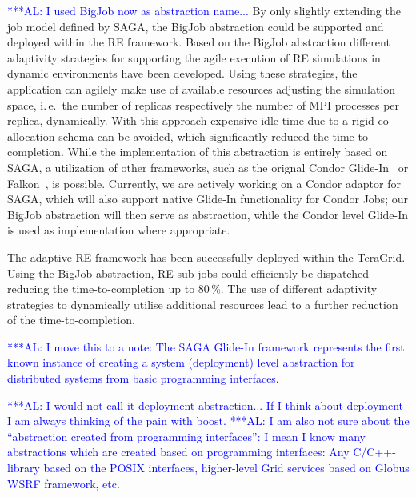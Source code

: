 \documentclass{rspublic}
\newcommand{\alnote}[1]{ {\textcolor{blue} { ***AL: #1 }}}
\newcommand{\alnote}[1]{}
\newcommand{\glidein}[1]{Glide-In }
\begin{document}
\alnote{I used BigJob now as abstraction name...}
By only slightly extending the job model defined by SAGA, the BigJob 
abstraction could be supported and deployed within the RE framework.  
Based on the BigJob abstraction different adaptivity strategies for supporting
the agile execution of RE simulations in dynamic environments have been
developed. Using these strategies, the application can agilely make use 
of available resources adjusting the simulation space, i.\,e.\ the number 
of replicas respectively the number of MPI processes per replica, dynamically. 
With this approach expensive idle time due to a rigid co-allocation 
schema can be avoided, which significantly reduced the time-to-completion. 
While the implementation of this abstraction is entirely based
on SAGA, a utilization of other frameworks, such as the orignal Condor
Glide-In~\citep{citeulike:291860} or Falkon~\citep{1362680}, is
possible. Currently, we are actively working on a Condor adaptor for
SAGA, which will also support native Glide-In functionality for Condor
Jobs; our BigJob abstraction will then serve as abstraction, while the
Condor level Glide-In is used as implementation where appropriate.

The adaptive RE framework has been successfully deployed within 
the TeraGrid. 
Using the BigJob abstraction, RE sub-jobs could efficiently be dispatched 
reducing the time-to-completion up to 80\,\%. The use of different 
adaptivity strategies to dynamically utilise additional resources lead 
to a further reduction of the time-to-completion.


\alnote{I move this to a note:
The SAGA \glidein\ framework represents the first known instance of creating a
system (deployment) level abstraction for distributed systems from
basic programming interfaces.} 

\alnote{I would not call it deployment abstraction... If I think about
deployment I am always thinking of the pain with boost.}
\alnote{I am also not sure about the ``abstraction created from 
  programming interfaces'': 
  I mean I know many abstractions which are created based on
  programming interfaces: Any C/C++-library based on the POSIX
  interfaces, higher-level Grid services based on Globus WSRF
  framework, etc.}   
\end{document}
